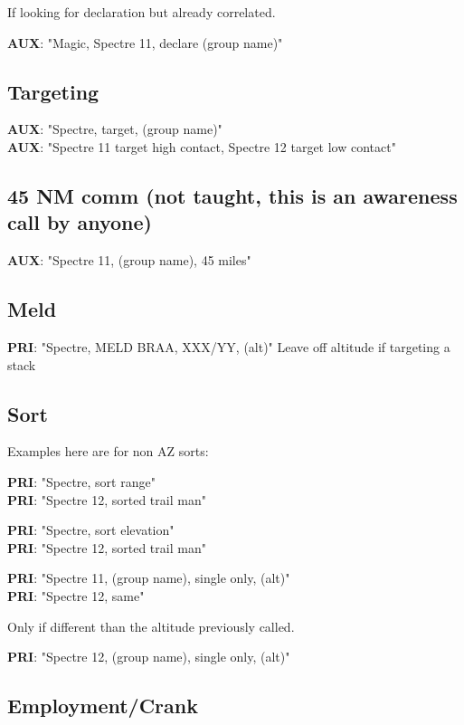 If looking for declaration but already correlated.

\textbf{AUX}: "Magic, Spectre 11, declare (group name)"

\subsection*{Targeting}

\textbf{AUX}: "Spectre, target, (group name)" \\
\textbf{AUX}: "Spectre 11 target high contact, Spectre 12 target low contact"

\subsection*{45 NM comm (not taught, this is an awareness call by anyone)}

\textbf{AUX}: "Spectre 11, (group name), 45 miles"

\subsection*{Meld}

\textbf{PRI}: "Spectre, MELD BRAA, XXX/YY, (alt)" Leave off altitude if
targeting a stack

\newpage

\subsection*{Sort}

Examples here are for non AZ sorts:

\textbf{PRI}: "Spectre, sort range"\\
\textbf{PRI}: "Spectre 12, sorted trail man"

\textbf{PRI}: "Spectre, sort elevation"\\
\textbf{PRI}: "Spectre 12, sorted trail man"

\textbf{PRI}: "Spectre 11, (group name), single only, (alt)"\\
\textbf{PRI}: "Spectre 12, same"

Only if different than the altitude previously called.

\textbf{PRI}: "Spectre 12, (group name), single only, (alt)"

\subsection*{Employment/Crank}

